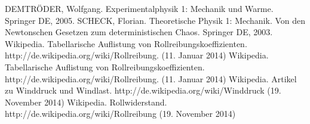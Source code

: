 \pagebreak
\begin{thebibliography}{9}
 DEMTRÖDER, Wolfgang. Experimentalphysik 1: Mechanik und Warme. Springer DE, 2005.
SCHECK, Florian. Theoretische Physik 1: Mechanik. Von den Newtonschen Gesetzen zum deterministischen Chaos. Springer DE, 2003.
 Wikipedia. Tabellarische Auflistung von Rollreibungskoeffizienten. http://de.wikipedia.org/wiki/Rollreibung. (11. Januar 2014)
 Wikipedia. Tabellarische Auflistung von Rollreibungskoeffizienten. http://de.wikipedia.org/wiki/Rollreibung. (11. Januar 2014)
 Wikipedia. Artikel zu Winddruck und Windlast. http://de.wikipedia.org/wiki/Winddruck (19. November 2014)
 Wikipedia. Rollwiderstand. http://de.wikipedia.org/wiki/Rollreibung (19. November 2014)
\end{thebibliography}
